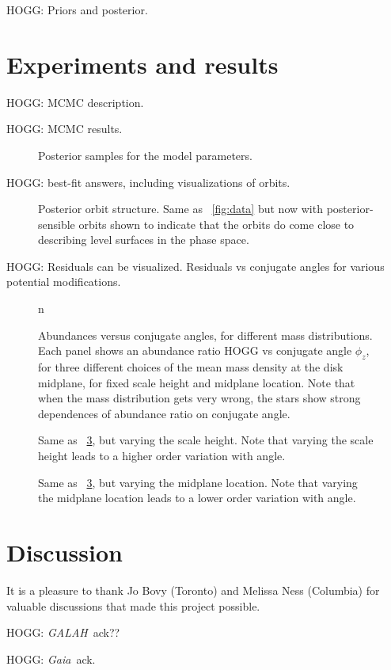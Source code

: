 \documentclass[modern]{aastex62}
\newcommand{\acronym}[1]{{\small{#1}}}
\newcommand{\project}[1]{\textsl{#1}}
\newcommand{\galah}{\project{\acronym{GALAH}}}
\newcommand{\gaia}{\project{Gaia}}
\begin{document}
HOGG: Priors and posterior.

\section{Experiments and results}

HOGG: MCMC description.

HOGG: MCMC results.
\begin{figure}
\caption{Posterior samples for the model parameters.\label{fig:samples}}
\end{figure}

HOGG: best-fit answers, including visualizations of orbits.
\begin{figure}
\caption{Posterior orbit structure. Same as \figurename~\ref{fig:data} but now with
posterior-sensible orbits shown to indicate that the orbits do come close to describing
level surfaces in the phase space.\label{fig:orbits}}
\end{figure}

HOGG: Residuals can be visualized. Residuals vs conjugate angles for various potential modifications.

\begin{figure}
n\caption{Abundances versus conjugate angles, for different mass distributions.
Each panel shows an abundance ratio HOGG vs conjugate angle $\phi_z$, for three different
choices of the mean mass density at the disk midplane, for fixed scale height and midplane
location. Note that when the mass distribution gets very wrong, the stars show strong
dependences of abundance ratio on conjugate angle.\label{fig:density}}
\end{figure}

\begin{figure}
\caption{Same as \figurename~\ref{fig:density}, but varying the scale height. Note that
varying the scale height leads to a higher order variation with angle.\label{fig:scaleheight}}
\end{figure}

\begin{figure}
\caption{Same as \figurename~\ref{fig:density}, but varying the midplane location. Note
that varying the midplane location leads to a lower order variation with angle.\label{fig:midplane}}
\end{figure}

\section{Discussion}

\acknowledgements
It is a pleasure to thank
  Jo Bovy (Toronto)
  and
  Melissa Ness (Columbia)
for valuable discussions that made this project possible.

HOGG: \galah\ ack??

HOGG: \gaia\ ack.


\end{document}
